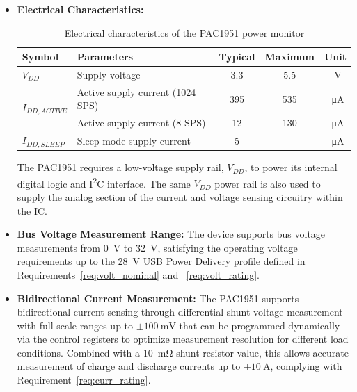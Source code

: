 \begin{itemize}

    \item \textbf{Electrical Characteristics:}

    \begin{table}[H]
        \centering
        \renewcommand{\arraystretch}{1.3}
        \caption{Electrical characteristics of the PAC1951 power monitor}
        \label{tab:pac1951_electrical}

        \begin{tabularx}{0.9\textwidth}{|l|X|c|c|c|}
            \hline
            \textbf{Symbol} &
            \textbf{Parameters} &
            \textbf{Typical} &
            \textbf{Maximum} &
            \textbf{Unit} \\
            \hline

            $V_{DD}$ & Supply voltage & 3.3 & 5.5 & \SI{}{\volt} \\
            \hline

            \multirow{2}{*}{$I_{DD,ACTIVE}$} 
            & Active supply current (1024 SPS) & 395 & 535 & \SI{}{\micro\ampere} \\ \cline{2-5}
            & Active supply current (8 SPS) & 12 & 130 & \SI{}{\micro\ampere} \\
            \hline

            $I_{DD,SLEEP}$ & Sleep mode supply current & 5 & - & \SI{}{\micro\ampere} \\
            \hline

        \end{tabularx}
    \end{table}
    The PAC1951 requires a low-voltage supply rail, $V_{DD}$, to power its internal digital logic and I\textsuperscript{2}C interface. The same $V_{DD}$ power rail is also used to supply the analog section of the current and voltage sensing circuitry within the IC.

    \item \textbf{Bus Voltage Measurement Range:}  
    The device supports bus voltage measurements from \SI{0}{\volt} to \SI{32}{\volt}, satisfying the operating voltage requirements up to the \SI{28}{\volt} USB Power Delivery profile defined in Requirements~\ref{req:volt_nominal} and ~\ref{req:volt_rating}.

    \item \textbf{Bidirectional Current Measurement:}  
    The PAC1951 supports bidirectional current sensing through differential shunt voltage measurement with full-scale ranges up to $\pm\SI{100}{\milli\volt}$ that can be programmed dynamically via the control registers to optimize measurement resolution for different load conditions. Combined with a \SI{10}{\milli\ohm} shunt resistor value, this allows accurate measurement of charge and discharge currents up to $\pm\SI{10}{\ampere}$, complying with Requirement~\ref{req:curr_rating}.


\end{itemize}
